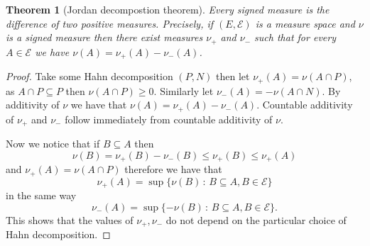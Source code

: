 \documentclass[11pt]{article}
\newtheorem{thm}{Theorem}[section]
\theoremstyle{definition}
\theoremstyle{remark}
\begin{document}
\begin{thm}[Jordan decompostion theorem]
Every signed measure is the difference of two positive measures. Precisely, if $(E, \mathcal{E})$ is a measure space and $\nu$ is a signed measure then there exist measures $\nu_+$ and $\nu_-$ such that for every $A \in \mathcal{E}$ we have $\nu(A) = \nu_+(A)- \nu_-(A)$.
\end{thm}
\begin{proof}
Take some Hahn decomposition $(P, N)$ then let $\nu_+(A) = \nu(A \cap P)$, as $A \cap P \subseteq P$ then $\nu(A \cap P) \geq 0$. Similarly let $\nu_-(A) = -\nu(A \cap N)$. By additivity of $\nu$ we have that $\nu(A) = \nu_+(A) - \nu_-(A)$. Countable additivity of $\nu_+$ and $\nu_-$ follow immediately from countable additivity of $\nu$.

Now we notice that if $B \subseteq A$ then
\[ \nu(B) = \nu_+(B) - \nu_-(B) \leq \nu_+(B) \leq \nu_+(A) \] and $\nu_+(A) = \nu(A \cap P)$ therefore we have that
\[ \nu_+(A)  = \sup\{\nu(B) \,:\, B \subseteq A, B \in \mathcal{E}\} \] in the same way
\[ \nu_-(A) = \sup\{ - \nu(B) \,:\, B \subseteq A, B \in \mathcal{E}\}. \] This shows that the values of $\nu_+, \nu_-$ do not depend on the particular choice of Hahn decomposition.
\end{proof}
\end{document}
